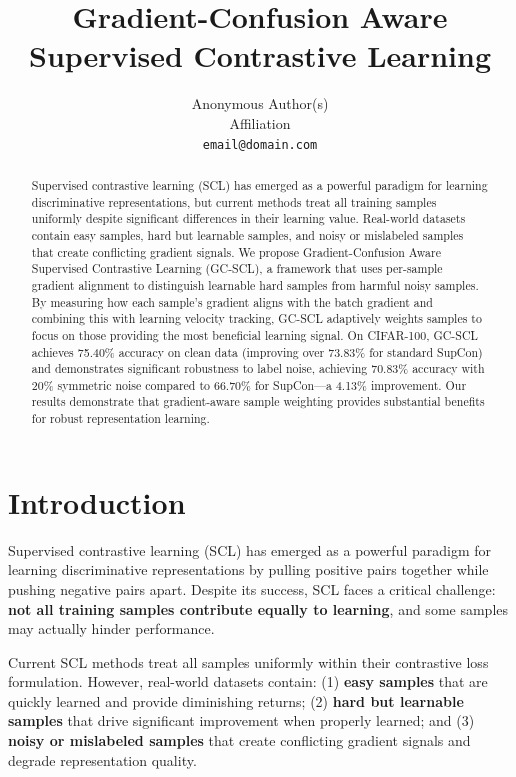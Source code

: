 \documentclass{article}
\title{Gradient-Confusion Aware Supervised Contrastive Learning}
\author{%
  Anonymous Author(s)\\
  Affiliation\\
  \texttt{email@domain.com}
}
\begin{document}
\maketitle

\begin{abstract}
Supervised contrastive learning (SCL) has emerged as a powerful paradigm for learning discriminative representations, but current methods treat all training samples uniformly despite significant differences in their learning value. Real-world datasets contain easy samples, hard but learnable samples, and noisy or mislabeled samples that create conflicting gradient signals. We propose Gradient-Confusion Aware Supervised Contrastive Learning (GC-SCL), a framework that uses per-sample gradient alignment to distinguish learnable hard samples from harmful noisy samples. By measuring how each sample's gradient aligns with the batch gradient and combining this with learning velocity tracking, GC-SCL adaptively weights samples to focus on those providing the most beneficial learning signal. On CIFAR-100, GC-SCL achieves 75.40\% accuracy on clean data (improving over 73.83\% for standard SupCon) and demonstrates significant robustness to label noise, achieving 70.83\% accuracy with 20\% symmetric noise compared to 66.70\% for SupCon---a 4.13\% improvement. Our results demonstrate that gradient-aware sample weighting provides substantial benefits for robust representation learning.
\end{abstract}

\section{Introduction}

Supervised contrastive learning (SCL) \citep{khosla2020supervised} has emerged as a powerful paradigm for learning discriminative representations by pulling positive pairs together while pushing negative pairs apart. Despite its success, SCL faces a critical challenge: \textbf{not all training samples contribute equally to learning}, and some samples may actually hinder performance.

Current SCL methods treat all samples uniformly within their contrastive loss formulation. However, real-world datasets contain: (1) \textbf{easy samples} that are quickly learned and provide diminishing returns; (2) \textbf{hard but learnable samples} that drive significant improvement when properly learned; and (3) \textbf{noisy or mislabeled samples} that create conflicting gradient signals and degrade representation quality.
\end{document}
